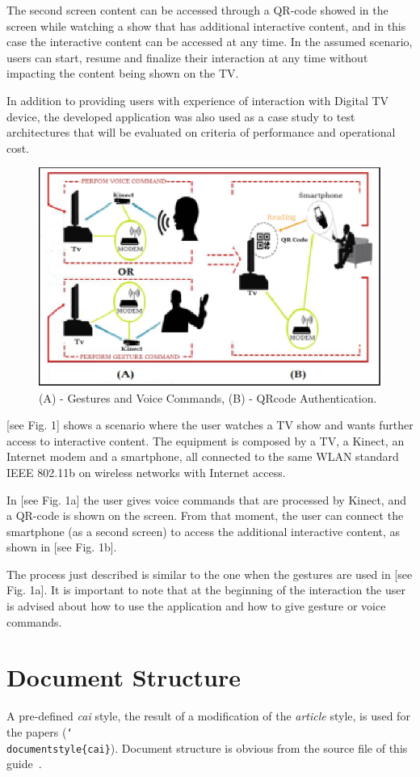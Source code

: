 \documentclass{cai}
\def\bs#1{{\tt\char`\\#1}}
\begin{document}
The second screen content can be accessed through a QR-code showed in the screen while watching a show that has additional interactive content, and in this case the interactive content can be accessed at any time. In the assumed scenario, users can start, resume and finalize their interaction at any time without impacting the content being shown on the TV.

In addition to providing users with experience of interaction with Digital TV device, the developed application was also used as a case study to test architectures that will be evaluated on criteria of performance and operational cost.
\begin{figure}
 \centering
 \includegraphics[width=0.4 \linewidth]{images/Picture1.eps}
 \caption{(A) - Gestures and Voice Commands, (B) - QRcode Authentication.}\label{figone}
\end{figure}
[see Fig. 1] shows a scenario where the user watches a TV show and wants further access to interactive content. The equipment is composed by a TV, a Kinect, an Internet modem and a smartphone, all connected to the same WLAN standard IEEE 802.11b on wireless networks with Internet access.

In [see Fig. 1a] the user gives voice commands that are processed by Kinect, and a QR-code is shown on the screen. From that moment, the user can connect the smartphone (as a second screen) to access the additional interactive content, as shown in [see Fig. 1b].

The process just described is similar to the one when the gestures are used in [see Fig. 1a]. It is important to note that at the beginning of the interaction the user is advised about how to use the application and how to give gesture or voice commands.
\section{Document Structure}

A pre-defined \textit{cai} style, the result of a modification of the \textit{article} style, is used for the
papers (\bs{documentstyle\{cai\}}). Document structure is obvious from the source file of this
guide~\cite{cai-style}.
\end{document}
